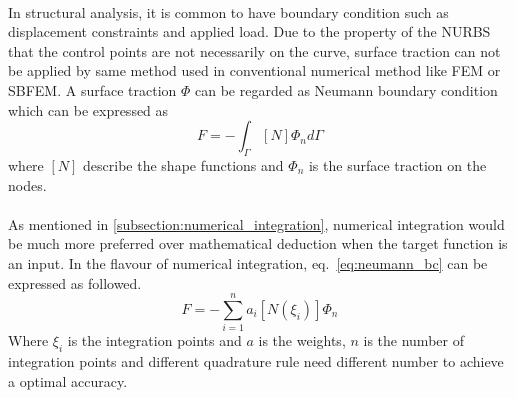 \paragraph{}
In structural analysis, it is common to have boundary condition such as displacement constraints and applied load.
Due to the property of the NURBS that the control points are not necessarily on the curve, surface traction can not be
    applied by same method used in conventional numerical method like FEM or SBFEM.
A surface traction $\Phi$ can be regarded as Neumann boundary condition which can be expressed as
    \begin{equation}
        {F}=-\int_{\Gamma}
        [N]
        \Phi_n
        d\Gamma
    \label{eq:neumann_bc}
    \end{equation}
where $[N]$ describe the shape functions and $\Phi_n$ is the surface traction on the nodes.

\paragraph{}
As mentioned in \ref{subsection:numerical_integration}, numerical integration would be much more preferred over mathematical deduction
when the target function is an input. In the flavour of numerical integration, eq.~\ref{eq:neumann_bc} can be expressed as followed.
    \begin{equation}
        {F}=-\sum_{i=1}^n
        a_i
        [N(\xi_i)]
        \Phi_n
    \label{eq:neumann_bc_numerical}
    \end{equation}
Where $\xi_i$ is the integration points and $a$ is the weights,
$n$ is the number of integration points and different quadrature rule need different number to achieve a optimal accuracy.

